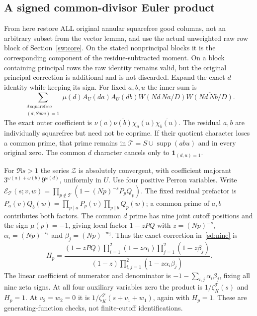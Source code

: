 \documentclass[11pt]{article}
\theoremstyle{definition}\newtheorem{definition}[theorem]{Definition}
\theoremstyle{remark}\newtheorem{remark}[theorem]{Remark}
\begin{document}
\subsection{A signed common-divisor Euler product}
From here restore ALL original annular squarefree good columns, not an
arbitrary subset from the vector lemma, and use the actual unweighted
raw row block of Section~\ref{sw:core}.
On the stated nonprincipal blocks it is the corresponding component of
the residue-subtracted moment. On a block containing principal rows the
raw identity remains valid, but the original principal correction is
additional and is not discarded.
Expand the exact $d$ identity while keeping its sign. For fixed $a,b,u$
the inner sum is
\begin{equation}\label{sd:inner}
 \sum_{\substack{d\ \mathrm{squarefree}\\(d,Sabu)=1}}
 \mu(d)A_U(da)A_U(db)
       W(Nd\,Na/D)\overline{W(Nd\,Nb/D)}.
\end{equation}
The exact outer coefficient is
$\nu(a)\overline{\nu(b)}\chi_a(u)\overline{\chi_b(u)}$.
The residual $a,b$ are individually squarefree but need not be coprime.
If their quotient character loses a common prime, that prime remains in
$\mathcal T=S\cup\operatorname{supp}(abu)$ and in every original zero.
The common $d$ character cancels only to $\mathbf1_{(d,u)=1}$.

For $\Re s>1$ the series $\mathcal Z$ is absolutely convergent, with
coefficient majorant
$3^{\omega(a)+\omega(b)}9^{\omega(d)}$, uniformly in $U$.
Use four positive Perron variables. Write $\mathcal E_{\mathcal T}(s;v,w)
=\prod_{p\notin\mathcal T}(1-(Np)^{-s}P_pQ_p)$.
The fixed residual prefactor is
$P_a(v)Q_b(w)=\prod_{p\mid a}P_p(v)\prod_{p\mid b}Q_p(w)$;
a common prime of $a,b$ contributes both factors.
The common $d$ prime has nine joint cutoff positions and the sign
$\mu(p)=-1$, giving local factor $1-zPQ$ with
$z=(Np)^{-s}$, $\alpha_i=(Np)^{-v_i}$ and $\beta_j=(Np)^{-w_j}$.
Thus the exact correction in~\eqref{sd:nine} is
\begin{equation}\label{sd:local-correction}
 H_p=\frac{(1-zPQ)\prod_{i=1}^2(1-z\alpha_i)
                           \prod_{j=1}^2(1-z\beta_j)}
                {(1-z)\prod_{i,j=1}^2(1-z\alpha_i\beta_j)}.
\end{equation}
The linear coefficient of numerator and denominator is
$-1-\sum_{i,j}\alpha_i\beta_j$, fixing all nine zeta signs.
At all four auxiliary variables zero the product is
$1/\zeta_K^{\mathcal T}(s)$ and $H_p=1$.
At $v_2=w_2=0$ it is $1/\zeta_K^{\mathcal T}(s+v_1+w_1)$, again
with $H_p=1$. These are generating-function checks, not finite-cutoff
identifications.
\end{document}
